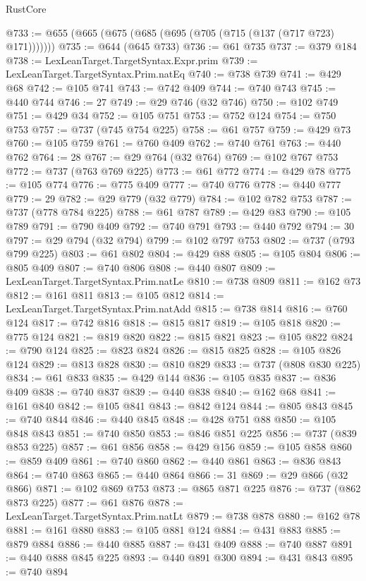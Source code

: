 \begin{lexlean}{RustCore}
\begin{coremodule}
@733 := @655 (@665 (@675 (@685 (@695 (@705 (@715 (@137 (@717 @723) @171)))))))
@735 := @644 (@645 @733)
@736 := @61 @735
@737 := @379 @184
@738 := LexLeanTarget.TargetSyntax.Expr.prim
@739 := LexLeanTarget.TargetSyntax.Prim.natEq
@740 := @738 @739
@741 := @429 @68
@742 := @105 @741
@743 := @742 @409
@744 := @740 @743
@745 := @440 @744
@746 := 27
@749 := @29 @746 (@32 @746)
@750 := @102 @749
@751 := @429 @34
@752 := @105 @751
@753 := @752 @124
@754 := @750 @753
@757 := @737 (@745 @754 @225)
@758 := @61 @757
@759 := @429 @73
@760 := @105 @759
@761 := @760 @409
@762 := @740 @761
@763 := @440 @762
@764 := 28
@767 := @29 @764 (@32 @764)
@769 := @102 @767 @753
@772 := @737 (@763 @769 @225)
@773 := @61 @772
@774 := @429 @78
@775 := @105 @774
@776 := @775 @409
@777 := @740 @776
@778 := @440 @777
@779 := 29
@782 := @29 @779 (@32 @779)
@784 := @102 @782 @753
@787 := @737 (@778 @784 @225)
@788 := @61 @787
@789 := @429 @83
@790 := @105 @789
@791 := @790 @409
@792 := @740 @791
@793 := @440 @792
@794 := 30
@797 := @29 @794 (@32 @794)
@799 := @102 @797 @753
@802 := @737 (@793 @799 @225)
@803 := @61 @802
@804 := @429 @88
@805 := @105 @804
@806 := @805 @409
@807 := @740 @806
@808 := @440 @807
@809 := LexLeanTarget.TargetSyntax.Prim.natLe
@810 := @738 @809
@811 := @162 @73
@812 := @161 @811
@813 := @105 @812
@814 := LexLeanTarget.TargetSyntax.Prim.natAdd
@815 := @738 @814
@816 := @760 @124
@817 := @742 @816
@818 := @815 @817
@819 := @105 @818
@820 := @775 @124
@821 := @819 @820
@822 := @815 @821
@823 := @105 @822
@824 := @790 @124
@825 := @823 @824
@826 := @815 @825
@828 := @105 @826 @124
@829 := @813 @828
@830 := @810 @829
@833 := @737 (@808 @830 @225)
@834 := @61 @833
@835 := @429 @144
@836 := @105 @835
@837 := @836 @409
@838 := @740 @837
@839 := @440 @838
@840 := @162 @68
@841 := @161 @840
@842 := @105 @841
@843 := @842 @124
@844 := @805 @843
@845 := @740 @844
@846 := @440 @845
@848 := @428 @751 @88
@850 := @105 @848 @843
@851 := @740 @850
@853 := @846 @851 @225
@856 := @737 (@839 @853 @225)
@857 := @61 @856
@858 := @429 @156
@859 := @105 @858
@860 := @859 @409
@861 := @740 @860
@862 := @440 @861
@863 := @836 @843
@864 := @740 @863
@865 := @440 @864
@866 := 31
@869 := @29 @866 (@32 @866)
@871 := @102 @869 @753
@873 := @865 @871 @225
@876 := @737 (@862 @873 @225)
@877 := @61 @876
@878 := LexLeanTarget.TargetSyntax.Prim.natLt
@879 := @738 @878
@880 := @162 @78
@881 := @161 @880
@883 := @105 @881 @124
@884 := @431 @883
@885 := @879 @884
@886 := @440 @885
@887 := @431 @409
@888 := @740 @887
@891 := @440 @888 @845 @225
@893 := @440 @891 @300
@894 := @431 @843
@895 := @740 @894

\end{coremodule}
\end{lexlean}
